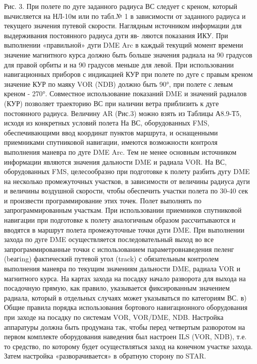   
Рис. 3.	При полете по дуге заданного радиуса ВС следует с креном, который вычисляется на НЛ-10м или по табл.№ 1 в зависимости от заданного радиуса и текущего значения путевой скорости.
Наглядным источником информации для выдерживания постоянного радиуса дуги яв- ляются показания ИКУ. При выполнении «правильной» дуги DME Arc в каждый текущий момент времени значение магнитного курса должно быть больше значения радиала на 90 градусов для правой орбиты и на 90 градусов меньше для левой. 
При использовании навигационных приборов с индикацией КУР при полете по дуге с правым креном значение КУР по маяку VOR (NDB) должно быть 90°, при полете с левым креном - 270°.
Совместное использование показаний DME и значений радиалов (КУР) позволяет траекторию ВС при наличии ветра приблизить к дуге постоянного радиуса.
Величину AR (Рис.3) можно взять из Таблицы А8.9-Т5, исходя из конкретных условий полета 
На ВС, оборудованных FMS, обеспечивающими ввод координат пунктов маршрута, и оснащенными приемниками спутниковой навигации, имеются возможности контроля выполнения маневра по дуге DME Arc. Тем не менее основным источником информации являются значения дальности DME и радиала VOR.
На ВС, оборудованных FMS, целесообразно при подготовке к полету разбить дугу DME на несколько промежуточных участков, в зависимости от величины радиуса дуги и величины воздушной скорости, чтобы обеспечить участки полета по 30-40 сек и произвести программирование этих точек. Полет выполнять по запрограммированным участкам.
При использовании приемников спутниковой навигации при подготовке к полету аналогичным образом рассчитываются и вводятся в маршрут полета промежуточные точки дуги DME. При выполнении захода по дуге DME осуществляется последовательный выход во все запрограммированные точки с использованием параметровнаведения пеленг (bеагing) фактический путевой угол (track) с обязательным контролем выполнения маневра по текущим значениям дальности DME, радиала VOR и магнитного курса.
На картах захода на посадку начало разворота для выхода на посадочную прямую, как правило, указывается фиксированным значением радиала, который в отдельных случаях может указываться по категориям ВС.
в)	Общие правила порядка использования бортового навигационного оборудования при заходе на посадку по системам VOR, VOR/DME, NDB.
Настройка аппаратуры должна быть продумана так, чтобы перед четвертым разворотом на первом комплекте оборудования наведения был настроен ILS (VOR, NDB), т.е. то средство, по которому будет осуществляться заход на конечном участке захода. Затем настройка «разворачивается» в обратную сторону по STAR.
